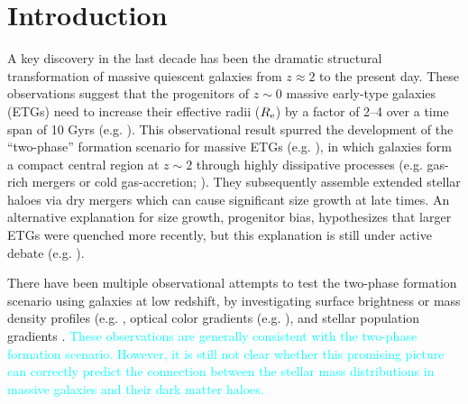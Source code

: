 \documentclass[a4paper,fleqn,usenatbib]{mnras}
\newcommand{\song}[1]{\textcolor{cyan}{#1}}
\begin{document}



\section{Introduction}
    \label{sec:intro}
    
    A key discovery in the last decade has been the dramatic structural transformation 
    of massive quiescent galaxies \citep[e.g.][]{Trujillo2006, vanDokkum2008, 
    Cimatti2008, Damjanov2009, vanderWel2011, Szomoru2012, Patel2013} from 
    $z \approx 2$ to the present day. 
    These observations suggest that the progenitors of $z{\sim} 0$ massive early-type 
    galaxies (ETGs) need to increase their effective radii ($R_{\rm e}$) by a factor 
    of 2--4 over a time span of 10 Gyrs (e.g. \citealt{Newman2012, vdWel2014}). 
    This observational result spurred the development of the ``two-phase'' formation
    scenario for massive ETGs (e.g. \citealt{Oser2010, Oser2012}),
    in which galaxies form a compact central region at $z\sim 2$ through highly 
    dissipative processes (e.g. gas-rich mergers or cold gas-accretion;
    \citealt{Hopkins2008, Dekel2009}). 
    They subsequently assemble extended stellar haloes via dry mergers 
    \citep[e.g,][]{Naab2006, Khochfar2006, Oser2010, Oser2012} which can cause 
    significant size growth at late times. 
    An alternative explanation for size growth, progenitor bias, hypothesizes that 
    larger ETGs were quenched more recently, but this explanation is still under 
    active debate (e.g. \citealt{Newman2012, Carollo2013, Poggianti2013, Belli2015,
    Keating2015, Fagioli2016}). 
    
    There have been multiple observational attempts to test the two-phase 
    formation scenario using galaxies at low redshift, by investigating surface 
    brightness or mass density profiles (e.g. \citealt{Huang2013a, Huang2013b, 
    Oh2017}, optical color gradients (e.g. \citealt{LaBarbera2010, LaBarbera2012}), 
    and stellar population gradients \citep[e.g.,][]{Coccato2010, Coccato2011, 
    Greene2015, Barbosa2016}. 
    \song{
    These observations are generally consistent with the two-phase formation scenario. 
    However, it is still not clear whether this promising picture can correctly 
    predict the connection between the stellar mass distributions in massive galaxies 
    and their dark matter haloes.
    }
    
\end{document}
